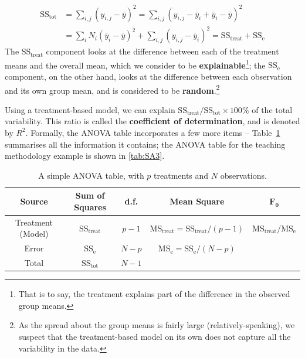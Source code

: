 \begin{align*}
   \text{SS}_{\textrm{tot}}&=\sum_{i,j}(y_{i,j}-\bar{y})^{2}=\sum_{i,j}(y_{i,j}-\bar{y}_{i}+\bar{y}_{i}-\bar{y})^{2}\\
    &=\sum_{i}N_{i}(\bar{y}_{i}-\bar{y})^{2}+\sum_{i,j}(y_{i,j}-\bar{y}_{i})^2=\text{SS}_{\textrm{treat}}+\text{SS}_{\textrm{e}}
\end{align*}
The $\text{SS}_{\textrm{treat}}$ component looks at the difference between each of the treatment means and the overall mean, which we consider to be \textbf{explainable}\footnote{That is to say, the treatment explains part of the difference in the observed group means.}; the $\text{SS}_{\textrm{e}}$ component, on the other hand, looks at the difference between each observation and its own group mean, and is considered to be \textbf{random}.\footnote{As the spread about the group means is fairly large (relatively-speaking), we suspect that the treatment-based model on its own does not capture all the variability in the data.} 
\par Using a treatment-based model, we can explain $\text{SS}_{\textrm{treat}}/\text{SS}_{\textrm{tot}}\times 100\%$ of the total variability. This ratio is called the \textbf{coefficient of determination}, and is denoted by $R^{2}$.
\newl Formally, the ANOVA table incorporates a few more items -- Table~\ref{tab:SA2} summarises all the information it contains; the ANOVA table for the teaching methodology example is shown in \ref{tab:SA3}.

     \begin{table}[!t]
         \centering
         \begin{tabular}{c c c c c}
         \hline
        \textbf{Source} & \textbf{Sum of Squares} & \textbf{d.f.} & \textbf{Mean Square} & $\mathbf{F_{0}}$ \\
         \hline
         Treatment (Model) & $\text{SS}_{\textrm{treat}}$ & $p-1$ & $\text{MS}_{\textrm{treat}}=\text{SS}_{\textrm{treat}}/(p-1)$ & $\text{MS}_{\textrm{treat}}/\text{MS}_{\textrm{e}}$\\
         Error & $\text{SS}_{\textrm{e}}$ & $N-p$ & $\text{MS}_{\textrm{e}}=\text{SS}_{\textrm{e}}/(N-p)$ \\
         Total & $\text{SS}_{\textrm{tot}}$ & $N-1$\\
        \hline
         \end{tabular}
         \caption[\small A simple ANOVA table]{\small A simple ANOVA table, with $p$ treatments and $N$ observations.}
         \label{tab:SA2}
     \end{table}



